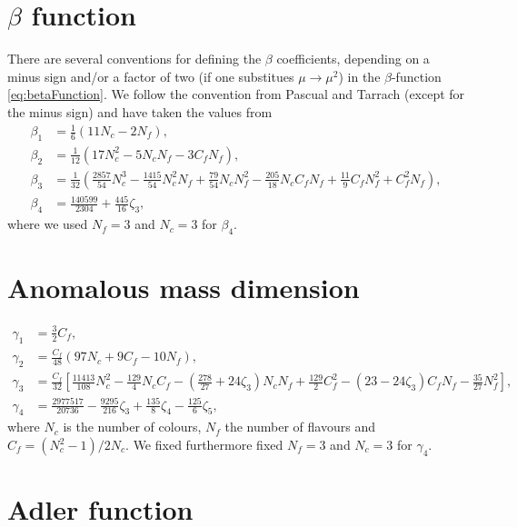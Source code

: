 \documentclass[../../index.tex]{subfiles}
\begin{document}
  \section{$\beta$ function}
  \label{sec:betaCoefficients}
  There are several conventions for defining the $\beta$ coefficients, depending
  on a minus sign and/or a factor of two (if one substitues $\mu \to \mu^2$) in
  the $\beta$-function \ref{eq:betaFunction}. We follow the convention from
  Pascual and Tarrach (except for the minus sign) and have taken the values from
  \cite{Boito2011}
  \begin{align}
    \beta_1 &= \frac{1}{6} (11N_c - 2N_f), \\
    \beta_2 &= \frac{1}{12} (17N_c^2 - 5N_cN_f - 3 C_fN_f), \\
    \beta_3 &= \frac{1}{32}\left( \frac{2857}{54}N_c^3 -\frac{1415}{54}N_c^2 N_f + \frac{79}{54} N_c N_f^2 - \frac{205}{18} N_c C_f N_f + \frac{11}{9} C_f N_f^2 + C_f^2 N_f \right), \\
    \beta_4 &= \frac{140599}{2304} + \frac{445}{16}\zeta_3,
  \end{align}
  where we used $N_f=3$ and $N_c=3$ for $\beta_4$.

  \section{Anomalous mass dimension}
  \label{app:gammaCoefficients}
  \begin{align}
    \gamma_1 &= \frac{3}{2}C_f, \\
    \gamma_2 &= \frac{C_f}{48}(97 N_c + 9 C_f - 10N_f), \\
    \gamma_3 &= \frac{C_f}{32}\left[ \frac{11413}{108} N_c^2 - \frac{129}{4} N_cC_f - \left( \frac{278}{27} + 24 \zeta_3 \right) N_c N_f + \frac{129}{2} C_f^2 - (23 - 24 \zeta_3) C_f N_f - \frac{35}{27} N_f^2 \right], \\
    \gamma_4 &= \frac{2977517}{20736} - \frac{9295}{216}\zeta_3 + \frac{135}{8}\zeta_4 - \frac{125}{6}\zeta_5,
  \end{align}
  where $N_c$ is the number of colours, $N_f$ the number of flavours and
  $C_f=(N_c^2-1)/2N_c$. We fixed furthermore fixed
  $N_f=3$ and $N_c=3$ for $\gamma_4$.


  \section{Adler function}
\end{document}
